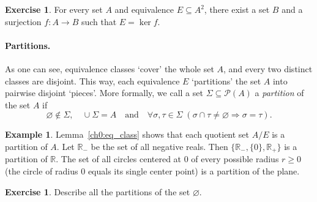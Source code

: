 \documentclass[12pt,notitlepage]{article}
\theoremstyle{plain}
\theoremstyle{definition}
\newtheorem{exc}[thm]{Exercise}
\newtheorem{exm}[thm]{Example}
\newtheorem{rem}[thm]{Remark}
\theoremstyle{plain}
\newcommand{\R}{\mathbb{R}}
\newcommand{\sbs}{\subseteq}
\newcommand{\void}{\varnothing}
\newcommand{\mP}{\mathcal{P}}
\newcommand{\1}{\mathbf{1}}
\newcommand{\0}{\mathbf{0}}
\newcommand{\ply}{\Longrightarrow}
\begin{document}
\begin{exc}
For every set $A$ and equivalence $E \sbs A^2$, there exist a set $B$ and a surjection $f\colon A \to B$ such that $E = \ker f$.
\end{exc}


\paragraph{Partitions.}
As one can see, equivalence classes `cover' the whole set $A$, and every two distinct classes are disjoint. This way, each equivalence $E$ `partitions' the set $A$ into pairwise disjoint `pieces'. More formally, we call a set $\Sigma \sbs \mP(A)$ a \emph{partition} of the set $A$ if
$$\void \notin \Sigma, \quad \cup \Sigma = A\quad\mbox{and}\quad \forall \sigma, \tau \in \Sigma\; (\sigma \cap \tau \neq \void \ply \sigma = \tau).$$
\begin{exm}
Lemma~\ref{ch0:eq_class} shows that each quotient set $A / E$ is a partition of $A$. Let $\R_{-}$ be the set of all negative reals. Then $\{\R_{-}, \{0\}, \R_{+}\}$ is a partition of $\R$. The set of all circles centered at $0$ of every possible radius $r \geq 0$ (the circle of radius $0$ equals its single center point) is a partition of the plane.
\end{exm}
\begin{exc}\label{L13:ex_part_empty}
Describe all the partitions of the set $\void$.
\end{exc}
\end{document}
